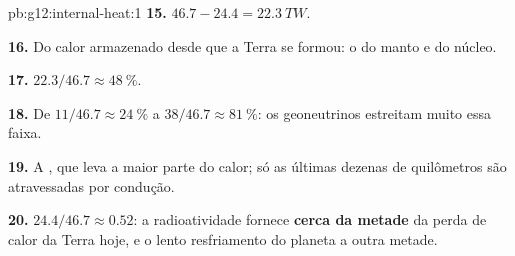 \begin{solution}{pb:g12:internal-heat:1}
\textbf{15.} $46.7 - 24.4 = \qty{22.3}{TW}$.

\textbf{16.} Do calor armazenado desde que a Terra se formou: o
 do manto e do núcleo.

\textbf{17.} $22.3/46.7 \approx \qty{48}{\percent}$.

\textbf{18.} De $11/46.7 \approx \qty{24}{\percent}$ a $38/46.7 \approx
\qty{81}{\percent}$: os geoneutrinos estreitam muito essa faixa.

\textbf{19.} A , que leva a maior parte do calor; só as
últimas dezenas de quilômetros são atravessadas por condução.

\textbf{20.} $24.4/46.7 \approx 0.52$: a radioatividade fornece
\textbf{cerca da metade} da perda de calor da Terra hoje, e o lento
resfriamento do planeta a outra metade.
\end{solution}
